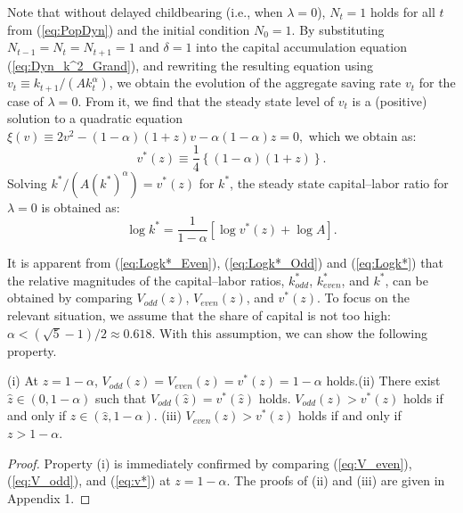 \documentclass{MBE}%
\begin{document}
{Note that without delayed childbearing (i.e., when $\lambda=0$), $N_{t}=1$
holds for all $t$ from (\ref{eq:PopDyn}) and the initial condition $N_{0}=1$.
By substituting $N_{t-1}=N_{t}=N_{t+1}=1$ and $\delta=1$ into the capital
accumulation equation (\ref{eq:Dyn_k^2_Grand}), and rewriting the resulting
equation using $v_{t}\equiv k_{t+1}/(Ak_{t}^{\alpha})$, we obtain the
evolution of the aggregate saving rate $v_{t}$ for the case of $\lambda=0$.
From it, we find that the steady state level of $v_{t}$ is a (positive)
solution to a quadratic equation $\xi\left(  v\right)  \equiv2v^{2}-\left(
1-\alpha\right)  \left(  1+z\right)  v-\alpha\left(  1-\alpha\right)  z=0,$
which we obtain as:
\begin{equation}
v^{\ast}(z)\equiv\frac{1}{4}\left\{  \left(  1-\alpha\right)  \left(
1+z\right)\right\}  .\label{eq:v*}%
\end{equation}
Solving  $k^{\ast}/(A\left(  k^{\ast}\right)  ^{\alpha})=v^{\ast}(z)$ for
$k^{\ast}$, the steady state capital--labor ratio for $\lambda=0$ is obtained
as:
\begin{equation}
\log k^{\ast}=\frac{1}{1-\alpha}\left[  \log v^{\ast}(z)+\log A\right]
.\label{eq:Logk*}%
\end{equation}


It is apparent from (\ref{eq:Logk*_Even}), (\ref{eq:Logk*_Odd}) and
(\ref{eq:Logk*}) that the relative magnitudes of the capital--labor ratios,
$k_{odd}^{\ast}$, $k_{even}^{\ast}$, and \noindent$k^{\ast}$, can be obtained
by comparing $V_{odd}(z)$, $V_{even}(z)$, and $v^{\ast}(z)$. To focus on the
relevant situation, we assume that the share of capital is not too high:
$\alpha<\left(  \sqrt{5}-1\right)  /2 \approx0.618$. With this assumption, we
can show the following property.

\begin{flLem}
\label{lm:Comparison}\textrm{(i)} At $z=1-\alpha$, $V_{odd}(z)=V_{even}(z)=v^{\ast}(z)=1-\alpha$
holds.\newline\textrm{(ii)} There exist $\widehat{z}\in\left(  0,1-\alpha\right)  $ such that
$V_{odd}(\widehat z)=v^{\ast}(\widehat z)$ holds. $V_{odd}(z)>v^{\ast}(z)$ holds if and only if $z
\in(\widehat{z}, 1-\alpha)$.
\newline\textrm{(iii)} $V_{even}(z)>v^{\ast}(z)$ holds if and only if $z>1-\alpha$.
\end{flLem}

\begin{proof}
Property (i) is immediately confirmed by comparing (\ref{eq:V_even}),
(\ref{eq:V_odd}), and (\ref{eq:v*}) at $z=1-\alpha$. The proofs of (ii) and
(iii) are given in Appendix 1.
\end{proof}

}
\end{document}
